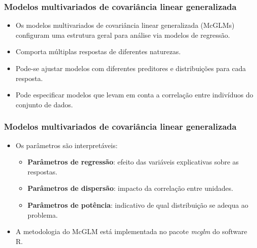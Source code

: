 \documentclass[10pt,
  aspectratio=169,
  serif,
  mathserif,
  professionalfont,
  compress,
  handout,
  ]{beamer}\usepackage[]{graphicx}\usepackage[]{color}
\begin{document}
\begin{frame}

\frametitle{Modelos multivariados de covariância linear generalizada}

\begin{itemize}
   
   \itemsep 2ex
   
  \item Os modelos multivariados de covariância linear generalizada (McGLMs) \cite{Bonat16} configuram uma estrutura geral para análise via modelos de regressão.
  
  \item Comporta múltiplas respostas de diferentes naturezas.
  
    \item Pode-se ajustar modelos com diferentes preditores e distribuições para cada resposta.
  
  \item Pode especificar modelos que levam em conta a correlação entre indivíduos do conjunto de dados. 

\end{itemize}

\end{frame}


\begin{frame}

\frametitle{Modelos multivariados de covariância linear generalizada}

\begin{itemize}
   
   \itemsep 2ex
  
  \item Os parâmetros são interpretáveis:
  
    \begin{itemize}
    
    \itemsep 2ex
      
      \item \textbf{Parâmetros de regressão}: efeito das variáveis explicativas sobre as respostas.
      
      \item \textbf{Parâmetros de dispersão}: impacto da correlação entre unidades.
      
      \item \textbf{Parâmetros de potência}: indicativo de qual distribuição se adequa ao problema.
      
    \end{itemize}
    
    \item A metodologia do McGLM está implementada no pacote \emph{mcglm} \cite{mcglm} do software R.

\end{itemize}

\end{frame}
\end{document}
